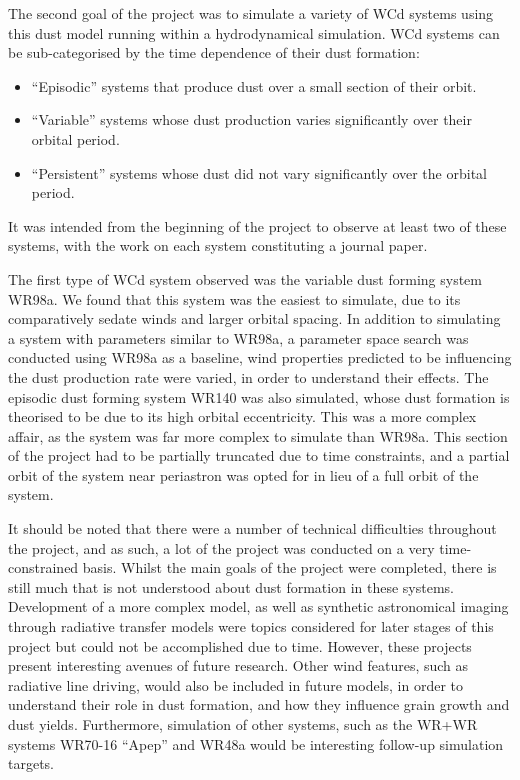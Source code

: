 The second goal of the project was to simulate a variety of WCd systems using this dust model running within a hydrodynamical simulation.
WCd systems can be sub-categorised by the time dependence of their dust formation:

\begin{itemize}
  \item ``Episodic'' systems that produce dust over a small section of their orbit. 
  \item ``Variable'' systems whose dust production varies significantly over their orbital period.
  \item ``Persistent'' systems whose dust did not vary significantly over the orbital period.
\end{itemize}

\noindent
It was intended from the beginning of the project to observe at least two of these systems, with the work on each system constituting a journal paper.

The first type of WCd system observed was the variable dust forming system WR98a.
We found that this system was the easiest to simulate, due to its comparatively sedate winds and larger orbital spacing. 
In addition to simulating a system with parameters similar to WR98a, a parameter space search was conducted using WR98a as a baseline, wind properties predicted to be influencing the dust production rate were varied, in order to understand their effects.
The episodic dust forming system WR140 was also simulated, whose dust formation is theorised to be due to its high orbital eccentricity.
This was a more complex affair, as the system was far more complex to simulate than WR98a.
This section of the project had to be partially truncated due to time constraints, and a partial orbit of the system near periastron was opted for in lieu of a full orbit of the system.

It should be noted that there were a number of technical difficulties throughout the project, and as such, a lot of the project was conducted on a very time-constrained basis.
Whilst the main goals of the project were completed, there is still much that is not understood about dust formation in these systems.
Development of a more complex model, as well as synthetic astronomical imaging through radiative transfer models were topics considered for later stages of this project but could not be accomplished due to time.
However, these projects present interesting avenues of future research.
Other wind features, such as radiative line driving, would also be included in future models, in order to understand their role in dust formation, and how they influence grain growth and dust yields.
Furthermore, simulation of other systems, such as the WR+WR systems WR70-16 ``Apep'' and WR48a would be interesting follow-up simulation targets.

